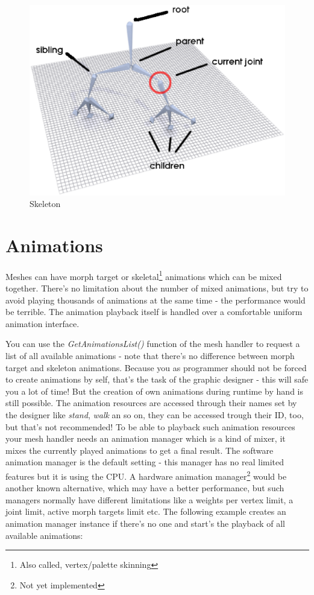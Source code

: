 \begin{figure}
  \centering
  \includegraphics[scale=0.5]{pics/Skeleton.eps}
  \caption{Skeleton}
  \label{fig:Skeleton}
\end{figure}




\section{Animations}
Meshes can have morph target or skeletal\footnote{Also called, vertex/palette skinning} animations which can be mixed together. There's no limitation about the number of mixed animations, but try to avoid playing thousands of animations at the same time - the performance would be terrible. The animation playback itself is handled over a comfortable uniform animation interface.

You can use the \emph{GetAnimationsList()} function of the mesh handler to request a list of all available animations - note that there's no difference between morph target and skeleton animations. Because you as programmer should not be forced to create animations by self, that's the task of the graphic designer - this will safe you a lot of time! But the creation of own animations during runtime by hand is still possible. The animation resources are accessed through their names set by the designer like \emph{stand}, \emph{walk} an so on, they can be accessed trough their ID, too, but that's not recommended! To be able to playback such animation resources your mesh handler needs an animation manager which is a kind of mixer, it mixes the currently played animations to get a final result. The software animation manager is the default setting - this manager has no real limited features but it is using the CPU. A hardware animation manager\footnote{Not yet implemented} would be another known alternative, which may have a better performance, but such managers normally have different limitations like a weights per vertex limit, a joint limit, active morph targets limit etc. The following example creates an animation manager instance if there's no one and start's the playback of all available animations:

